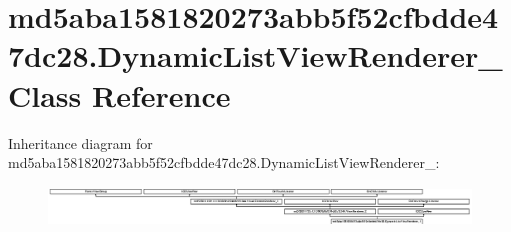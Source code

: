 \hypertarget{classmd5aba1581820273abb5f52cfbdde47dc28_1_1DynamicListViewRenderer__1}{}\section{md5aba1581820273abb5f52cfbdde47dc28.\+Dynamic\+List\+View\+Renderer\+\_ Class Reference}
\label{classmd5aba1581820273abb5f52cfbdde47dc28_1_1DynamicListViewRenderer__1}
Inheritance diagram for md5aba1581820273abb5f52cfbdde47dc28.\+Dynamic\+List\+View\+Renderer\+\_\+:\begin{figure}[H]
\begin{center}
\leavevmode
\includegraphics[height=1.046729cm]{classmd5aba1581820273abb5f52cfbdde47dc28_1_1DynamicListViewRenderer__1}
\end{center}
\end{figure}
